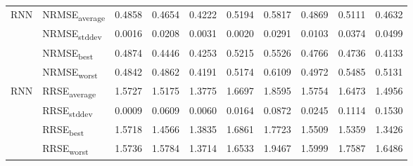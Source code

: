 {\begin{longtable}{l l c c c c c c c c}
\cmidrule(lr){2-10}
\multirow{4}{*}{RNN} & NRMSE\textsubscript{average} & 0.4858 & 0.4654 & 0.4222 & 0.5194 & 0.5817 & 0.4869 & 0.5111 & 0.4632 \\
 & NRMSE\textsubscript{stddev} & 0.0016 & 0.0208 & 0.0031 & 0.0020 & 0.0291 & 0.0103 & 0.0374 & 0.0499 \\
 & NRMSE\textsubscript{best} & 0.4874 & 0.4446 & 0.4253 & 0.5215 & 0.5526 & 0.4766 & 0.4736 & 0.4133 \\
 & NRMSE\textsubscript{worst} & 0.4842 & 0.4862 & 0.4191 & 0.5174 & 0.6109 & 0.4972 & 0.5485 & 0.5131 \\
\cmidrule(lr){2-10}
\multirow{4}{*}{RNN} & RRSE\textsubscript{average} & 1.5727 & 1.5175 & 1.3775 & 1.6697 & 1.8595 & 1.5754 & 1.6473 & 1.4956 \\
 & RRSE\textsubscript{stddev} & 0.0009 & 0.0609 & 0.0060 & 0.0164 & 0.0872 & 0.0245 & 0.1114 & 0.1530 \\
 & RRSE\textsubscript{best} & 1.5718 & 1.4566 & 1.3835 & 1.6861 & 1.7723 & 1.5509 & 1.5359 & 1.3426 \\
 & RRSE\textsubscript{worst} & 1.5736 & 1.5784 & 1.3714 & 1.6533 & 1.9467 & 1.5999 & 1.7587 & 1.6486 \\
\cmidrule(lr){2-10}
\end{longtable}
}